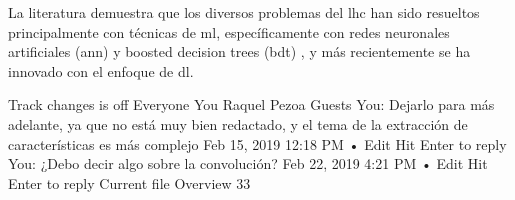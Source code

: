 La literatura demuestra que los diversos problemas del \acrshort{lhc} han sido resueltos principalmente con técnicas de \acrshort{ml}, específicamente con redes neuronales artificiales (\acrshort{ann}) y boosted decision trees (\acrshort{bdt}) \cite{Radovic2018}, y más recientemente se ha innovado con el enfoque de \acrshort{dl}.

%
Track changes is off
Everyone
You
Raquel Pezoa
Guests
You: Dejarlo para más adelante, ya que no está muy bien redactado, y el tema de la extracción de características es más complejo
Feb 15, 2019 12:18 PM • Edit
Hit Enter to reply
You: ¿Debo decir algo sobre la convolución?
Feb 22, 2019 4:21 PM • Edit
Hit Enter to reply
Current file
Overview
33


%


